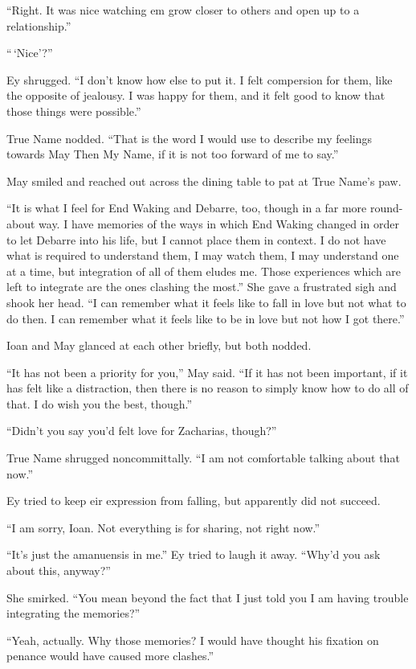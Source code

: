 ``Right. It was nice watching em grow closer to others and open up to a relationship.''

``\,`Nice'?''

Ey shrugged. ``I don't know how else to put it. I felt compersion for them, like the opposite of jealousy. I was happy for them, and it felt good to know that those things were possible.''

True Name nodded. ``That is the word I would use to describe my feelings towards May Then My Name, if it is not too forward of me to say.''

May smiled and reached out across the dining table to pat at True Name's paw.

``It is what I feel for End Waking and Debarre, too, though in a far more round-about way. I have memories of the ways in which End Waking changed in order to let Debarre into his life, but I cannot place them in context. I do not have what is required to understand them, I may watch them, I may understand one at a time, but integration of all of them eludes me. Those experiences which are left to integrate are the ones clashing the most.'' She gave a frustrated sigh and shook her head. ``I can remember what it feels like to fall in love but not what to do then. I can remember what it feels like to be in love but not how I got there.''

Ioan and May glanced at each other briefly, but both nodded.

``It has not been a priority for you,'' May said. ``If it has not been important, if it has felt like a distraction, then there is no reason to simply know how to do all of that. I do wish you the best, though.''

``Didn't you say you'd felt love for Zacharias, though?''

True Name shrugged noncommittally. ``I am not comfortable talking about that now.''

Ey tried to keep eir expression from falling, but apparently did not succeed.

``I am sorry, Ioan. Not everything is for sharing, not right now.''

``It's just the amanuensis in me.'' Ey tried to laugh it away. ``Why'd you ask about this, anyway?''

She smirked. ``You mean beyond the fact that I just told you I am having trouble integrating the memories?''

``Yeah, actually. Why those memories? I would have thought his fixation on penance would have caused more clashes.''

